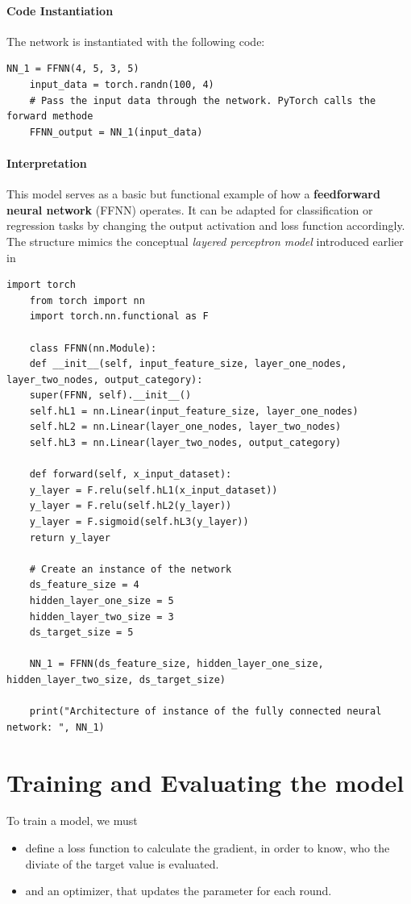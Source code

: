 \paragraph{Code Instantiation}
The network is instantiated with the following code:
\begin{lstlisting}[language=iPython]
	NN_1 = FFNN(4, 5, 3, 5)
	input_data = torch.randn(100, 4)
	# Pass the input data through the network. PyTorch calls the forward methode
	FFNN_output = NN_1(input_data)
\end{lstlisting}

\paragraph{Interpretation}
This model serves as a basic but functional example of how a \textbf{feedforward neural network} (FFNN) operates. It can be adapted for classification or regression tasks by changing the output activation and loss function accordingly. The structure mimics the conceptual \textit{layered perceptron model} introduced earlier in 



\begin{lstlisting}[language=iPython]
	import torch
	from torch import nn
	import torch.nn.functional as F
	
	class FFNN(nn.Module):
	def __init__(self, input_feature_size, layer_one_nodes, layer_two_nodes, output_category):
	super(FFNN, self).__init__()
	self.hL1 = nn.Linear(input_feature_size, layer_one_nodes)
	self.hL2 = nn.Linear(layer_one_nodes, layer_two_nodes)
	self.hL3 = nn.Linear(layer_two_nodes, output_category)
	
	def forward(self, x_input_dataset):
	y_layer = F.relu(self.hL1(x_input_dataset))
	y_layer = F.relu(self.hL2(y_layer))
	y_layer = F.sigmoid(self.hL3(y_layer))
	return y_layer
	
	# Create an instance of the network
	ds_feature_size = 4
	hidden_layer_one_size = 5
	hidden_layer_two_size = 3
	ds_target_size = 5
	
	NN_1 = FFNN(ds_feature_size, hidden_layer_one_size, hidden_layer_two_size, ds_target_size)
	
	print("Architecture of instance of the fully connected neural network: ", NN_1)
\end{lstlisting}

\section{Training and Evaluating the model}
To train a model, we must 
\begin{itemize}
	\item define a loss function to calculate the gradient, in order to know, who the diviate of the target value is evaluated.
	\item and an optimizer, that updates the parameter for each round.
\end{itemize}

